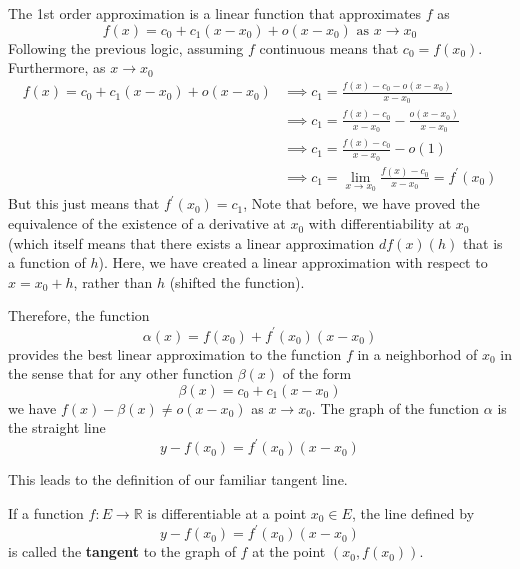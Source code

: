   \begin{example}
    The 1st order approximation is a linear function that approximates $f$ as
    \begin{equation}
      f(x) = c_0 + c_1(x - x_0) + o(x - x_0) \text{ as } x \rightarrow x_0
    \end{equation}
    Following the previous logic, assuming $f$ continuous means that $c_0 = f(x_0)$. Furthermore, as $x \rightarrow x_0$
    \begin{align}
      f(x) = c_0 + c_1(x - x_0) + o(x - x_0) & \implies c_1 = \frac{f(x) - c_0 - o(x - x_0)}{x - x_0} \\
      & \implies c_1 = \frac{f(x) - c_0}{x - x_0} - \frac{o(x - x_0)}{x - x_0}\\
      & \implies c_1 = \frac{f(x) - c_0}{x - x_0} - o(1) \\
      & \implies c_1 = \lim_{x \rightarrow x_0} \frac{f(x) - c_0}{x - x_0} = f^\prime (x_0)
    \end{align}
    But this just means that $f^\prime (x_0) = c_1$, Note that before, we have proved the equivalence of the existence of a derivative at $x_0$ with differentiability at $x_0$ (which itself means that there exists a linear approximation $df(x)(h)$ that is a function of $h$). Here, we have created a linear approximation with respect to $x = x_0 + h$, rather than $h$ (shifted the function). 

    Therefore, the function 
    \[\alpha (x) = f(x_0) + f^\prime (x_0) (x - x_0)\]
    provides the best linear approximation to the function $f$ in a neighborhod of $x_0$ in the sense that for any other function $\beta(x)$ of the form 
    \[\beta(x) = c_0 + c_1 (x - x_0)\]
    we have $f(x) - \beta(x) \neq o(x - x_0)$ as $x \rightarrow x_0$. The graph of the function $\alpha$ is the straight line
    \[y - f(x_0) = f^\prime (x_0) (x - x_0)\]

    This leads to the definition of our familiar tangent line. 
  \end{example}

  \begin{definition}
    If a function $f: E \longrightarrow \mathbb{R}$ is differentiable at a point $x_0 \in E$, the line defined by
    \begin{equation}
      y - f(x_0) = f^\prime (x_0) (x - x_0)
    \end{equation}
    is called the \textbf{tangent} to the graph of $f$ at the point $(x_0, f(x_0))$. 
  \end{definition}

